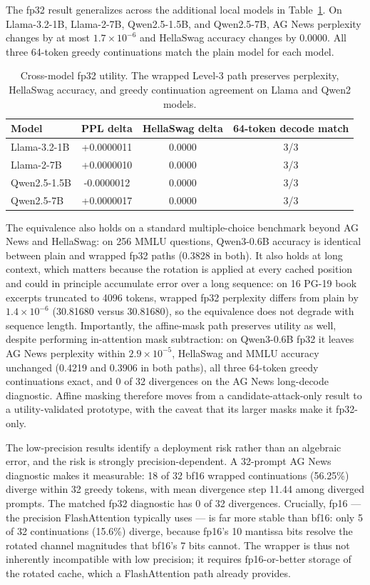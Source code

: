 The fp32 result generalizes across the additional local models in Table~\ref{tab:utility-multimodel}. On Llama-3.2-1B, Llama-2-7B, Qwen2.5-1.5B, and Qwen2.5-7B, AG News perplexity changes by at most $1.7\times 10^{-6}$ and HellaSwag accuracy changes by 0.0000. All three 64-token greedy continuations match the plain model for each model.

\begin{table}[t]
\centering
\caption{Cross-model fp32 utility. The wrapped Level-3 path preserves perplexity, HellaSwag accuracy, and greedy continuation agreement on Llama and Qwen2 models.}
\label{tab:utility-multimodel}
\begin{tabular}{lccc}
\toprule
Model & PPL delta & HellaSwag delta & 64-token decode match \\
\midrule
Llama-3.2-1B & +0.0000011 & 0.0000 & 3/3 \\
Llama-2-7B & +0.0000010 & 0.0000 & 3/3 \\
Qwen2.5-1.5B & -0.0000012 & 0.0000 & 3/3 \\
Qwen2.5-7B & +0.0000017 & 0.0000 & 3/3 \\
\bottomrule
\end{tabular}
\end{table}

The equivalence also holds on a standard multiple-choice benchmark beyond AG News and HellaSwag: on 256 MMLU questions, Qwen3-0.6B accuracy is identical between plain and wrapped fp32 paths (0.3828 in both). It also holds at long context, which matters because the rotation is applied at every cached position and could in principle accumulate error over a long sequence: on 16 PG-19 book excerpts truncated to 4096 tokens, wrapped fp32 perplexity differs from plain by $1.4\times10^{-6}$ (30.81680 versus 30.81680), so the equivalence does not degrade with sequence length. Importantly, the affine-mask path preserves utility as well, despite performing in-attention mask subtraction: on Qwen3-0.6B fp32 it leaves AG News perplexity within $2.9\times10^{-5}$, HellaSwag and MMLU accuracy unchanged (0.4219 and 0.3906 in both paths), all three 64-token greedy continuations exact, and 0 of 32 divergences on the AG News long-decode diagnostic. Affine masking therefore moves from a candidate-attack-only result to a utility-validated prototype, with the caveat that its larger masks make it fp32-only.

The low-precision results identify a deployment risk rather than an algebraic error, and the risk is strongly precision-dependent. A 32-prompt AG News diagnostic makes it measurable: 18 of 32 bf16 wrapped continuations (56.25\%) diverge within 32 greedy tokens, with mean divergence step 11.44 among diverged prompts. The matched fp32 diagnostic has 0 of 32 divergences. Crucially, fp16 --- the precision FlashAttention typically uses --- is far more stable than bf16: only 5 of 32 continuations (15.6\%) diverge, because fp16's 10 mantissa bits resolve the rotated channel magnitudes that bf16's 7 bits cannot. The wrapper is thus not inherently incompatible with low precision; it requires fp16-or-better storage of the rotated cache, which a FlashAttention path already provides.

